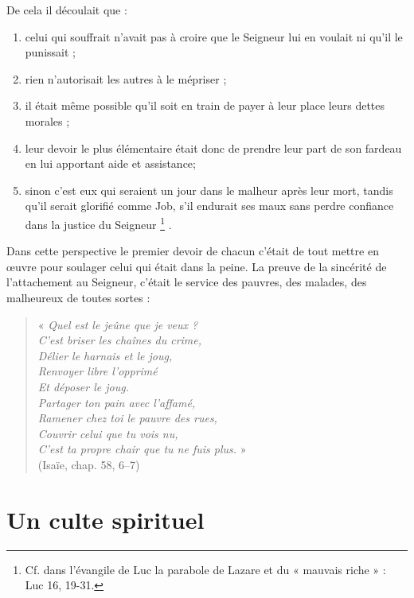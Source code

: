  De cela il découlait que :
\begin{enumerate}
\item celui qui souffrait n'avait pas à croire que le Seigneur lui en voulait ni qu'il le punissait ;
\item rien n'autorisait les autres à le mépriser ;
\item il était même possible qu'il soit en train de payer à leur place leurs dettes morales ;
\item leur devoir le plus élémentaire était donc de prendre leur part de son fardeau en lui apportant aide et assistance;
\item sinon c'est eux qui seraient un jour dans le malheur après leur mort, tandis qu'il serait glorifié comme Job, s'il endurait ses maux sans perdre confiance dans la justice du Seigneur%
\footnote{Cf. dans l'évangile de Luc la parabole de Lazare et du « mauvais riche » : Luc 16, 19-31.}%
.
\end{enumerate}

 Dans cette perspective le premier devoir de chacun c'était de tout mettre en œuvre pour soulager celui qui était dans la peine. La preuve de la sincérité de l'attachement au Seigneur, c'était le service des pauvres, des malades, des malheureux de toutes sortes :

\begin{verse}
 « \emph{Quel est le jeûne que je veux ? \\
 C'est briser les chaînes du crime, \\
 Délier le harnais et le joug, \\
 Renvoyer libre l'opprimé \\
 Et déposer le joug. \\
 Partager ton pain avec l'affamé, \\
 Ramener chez toi le pauvre des rues, \\
 Couvrir celui que tu vois nu, \\
 C'est ta propre chair que tu ne fuis plus.} » \\
 (Isaïe, chap. 58, 6--7)
\end{verse}

 
\section{Un culte spirituel}

